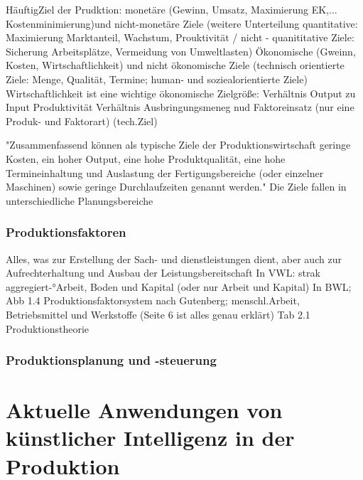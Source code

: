 \documentclass[a4paper,12pt, german]{report}
\begin{document}
HäuftigZiel der Prudktion: monetäre (Gewinn, Umsatz, Maximierung EK,... Kostenminimierung)und nicht-monetäre Ziele (weitere Unterteilung quantitative: Maximierung Marktanteil, Wachstum, Prouktivität / nicht - quanititative Ziele: Sicherung Arbeitsplätze, Vermeidung von Umweltlasten) 
Ökonomische (Gweinn, Kosten, Wirtschaftlichkeit) und nicht ökonomische Ziele (technisch orientierte Ziele: Menge, Qualität, Termine; human- und soziealorientierte Ziele)
Wirtschaftlichkeit ist eine wichtige ökonomische Zielgröße: Verhältnis Output zu Input
Produktivität Verhältnis Ausbringungsmeneg nud Faktoreinsatz (nur eine Produk- und Faktorart) (tech.Ziel)

"Zusammenfassend können als typische Ziele der Produktionswirtschaft geringe Kosten,
ein hoher Output, eine hohe Produktqualität, eine hohe Termineinhaltung und Auslastung
der Fertigungsbereiche (oder einzelner Maschinen) sowie geringe Durchlaufzeiten
genannt werden." Die Ziele fallen in unterschiedliche Planungsbereiche

\subsection{Produktionsfaktoren}

Alles, was zur Erstellung der Sach- und dienstleistungen dient, aber auch zur Aufrechterhaltung und Ausbau der Leistungsbereitschaft
In VWL: strak aggregiert-°Arbeit, Boden und Kapital (oder nur Arbeit und Kapital)
In BWL; Abb 1.4 Produktionsfaktorsystem nach Gutenberg; menschl.Arbeit, Betriebsmittel und Werkstoffe (Seite 6 ist alles genau erklärt)
Tab 2.1 Produktionstheorie

\subsection{Produktionsplanung und -steuerung}



\chapter{Aktuelle Anwendungen von künstlicher Intelligenz in der Produktion}




\end{document}
